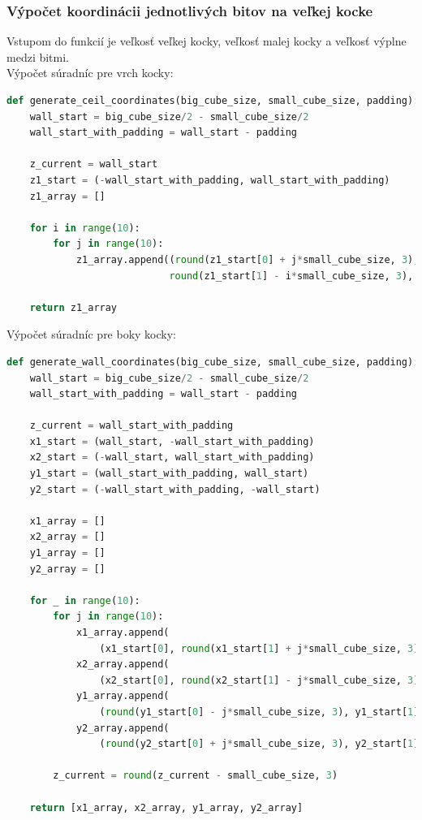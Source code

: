 \subsubsection{Výpočet koordinácii jednotlivých bitov na veľkej kocke}
Vstupom do funkcií je veľkosť veľkej kocky, veľkosť malej kocky a veľkosť výplne medzi bitmi.\\
Výpočet súradníc pre vrch kocky:
\begin{lstlisting}[language=Python]
def generate_ceil_coordinates(big_cube_size, small_cube_size, padding):
    wall_start = big_cube_size/2 - small_cube_size/2
    wall_start_with_padding = wall_start - padding

    z_current = wall_start
    z1_start = (-wall_start_with_padding, wall_start_with_padding)
    z1_array = []

    for i in range(10):
        for j in range(10):
            z1_array.append((round(z1_start[0] + j*small_cube_size, 3),
                            round(z1_start[1] - i*small_cube_size, 3), z_current))

    return z1_array
\end{lstlisting}
Výpočet súradníc pre boky kocky:
\begin{lstlisting}[language=Python]
def generate_wall_coordinates(big_cube_size, small_cube_size, padding):
    wall_start = big_cube_size/2 - small_cube_size/2
    wall_start_with_padding = wall_start - padding

    z_current = wall_start_with_padding
    x1_start = (wall_start, -wall_start_with_padding)
    x2_start = (-wall_start, wall_start_with_padding)
    y1_start = (wall_start_with_padding, wall_start)
    y2_start = (-wall_start_with_padding, -wall_start)

    x1_array = []
    x2_array = []
    y1_array = []
    y2_array = []

    for _ in range(10):
        for j in range(10):
            x1_array.append(
                (x1_start[0], round(x1_start[1] + j*small_cube_size, 3), z_current))
            x2_array.append(
                (x2_start[0], round(x2_start[1] - j*small_cube_size, 3), z_current))
            y1_array.append(
                (round(y1_start[0] - j*small_cube_size, 3), y1_start[1], z_current))
            y2_array.append(
                (round(y2_start[0] + j*small_cube_size, 3), y2_start[1], z_current))

        z_current = round(z_current - small_cube_size, 3)

    return [x1_array, x2_array, y1_array, y2_array]

\end{lstlisting}

